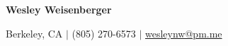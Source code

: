 \documentclass[11pt]{article}
\begin{document}

    \newcommand{\header}[1]{ 
        \vspace{2mm}
        {\large \noindent \textbf{#1}}
        \vspace{2mm}
        \hrule
        \vspace{3mm}
    }

    \begin{center}
        
        {\LARGE \textbf{Wesley Weisenberger}}
    
        \vspace{2mm}

        {\large Berkeley, CA  $\mid$ (805) 270-6573 
            $\mid$
            \href{mailto:wesleynw@pm.me}{wesleynw@pm.me}

        }

    \end{center}
\end{document}
